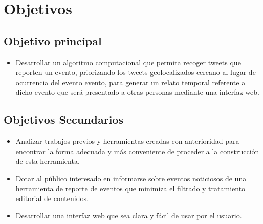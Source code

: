 \section{Objetivos}

\subsection{Objetivo principal}

\begin{itemize}
\item Desarrollar un algoritmo computacional que permita recoger tweets que reporten un evento, priorizando 
los tweets geolocalizados cercano al lugar de ocurrencia del evento evento, para generar un relato temporal
referente a dicho evento que será presentado a otras personas mediante una interfaz web.
\end{itemize}

\subsection{Objetivos Secundarios}
\begin{itemize}
\item Analizar trabajos previos y herramientas creadas con anterioridad para encontrar la forma adecuada
y más conveniente de proceder a la construcción de esta herramienta.
\item Dotar al público interesado en informarse sobre eventos noticiosos de una 
herramienta de reporte de eventos que minimiza el filtrado y tratamiento editorial de contenidos.
\item Desarrollar una interfaz web que sea clara y fácil de usar por el usuario.
\end{itemize}